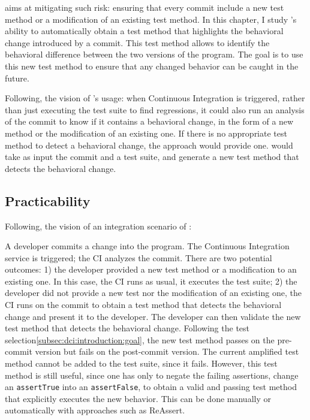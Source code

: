 \DCI aims at mitigating such risk: 
ensuring that every commit include a new test method or a modification of an existing test method.
In this chapter, I study \dspot's ability to automatically obtain a test method that highlights the behavioral change introduced by a commit.
This test method allows to identify the behavioral difference between the two versions of the program. 
The goal is to use this new test method to ensure that any changed behavior can be caught in the future.

Following, the vision of \DCI's usage:
when Continuous Integration is triggered, 
rather than just executing the test suite to find regressions, 
it could also run an analysis of the commit to know if it contains a behavioral change, 
in the form of a new method or the modification of an existing one.
If there is no appropriate test method to detect a behavioral change, the approach would provide one. 
\DCI would take as input the commit and a test suite, and generate a new test method that detects the behavioral change.

\subsection{Practicability}
\label{subsec:dci:background:practicability}

Following, the vision of an integration scenario of \DCI:

A developer commits a change into the program.
The Continuous Integration service is triggered;
the CI analyzes the commit.
There are two potential outcomes:
1) the developer provided a new test method or a modification to an existing one. 
In this case, the CI runs as usual, \eg it executes the test suite;
2) the developer did not provide a new test nor the modification of an existing one, the CI runs \DCI on the commit to obtain a test method that detects the behavioral change and present it to the developer.
The developer can then validate the new test method that detects the behavioral change.
Following the test selection\autoref{subsec:dci:introduction:goal}, the new test method passes on the pre-commit version but fails on the post-commit version.
The current amplified test method cannot be added to the test suite, since it fails.
However, this test method is still useful, since one has only to negate the failing assertions, \eg change an \texttt{assertTrue} into an \texttt{assertFalse}, to obtain a valid and passing test method that explicitly executes the new behavior.
This can be done manually or automatically with approaches such as ReAssert\cite{ReAssert}.

